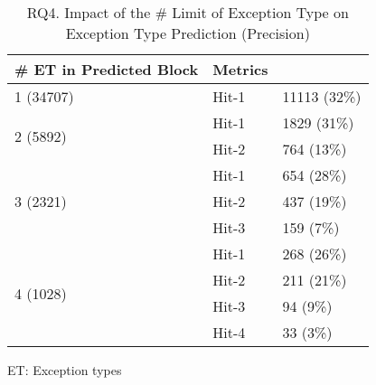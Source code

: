 \begin{table}[t]
	\caption{RQ4. Impact of the \# Limit of Exception Type on Exception Type Prediction (Precision)}
	\vspace{-10pt}
	\tabcolsep 2pt
	{\small
		\begin{center}
			\renewcommand{\arraystretch}{1}
			\begin{tabular}{p{3cm}<{\centering}|p{2cm}<{\centering}|p{2cm}<{\centering}}
				\hline
				\# ET in Predicted Block & Metrics & {\textsc{\tool}\xspace} \\
				\hline
				\multirow{1}{*}{1 (34707)}   & Hit-1  & 11113 (32\%) \\
				\hline
				\multirow{2}{*}{2 (5892)}  & Hit-1   & 1829 (31\%) \\
				& Hit-2       						& 764 (13\%) \\
				\hline
				\multirow{3}{*}{3 (2321)}  & Hit-1    & 654 (28\%) \\
				& Hit-2         					& 437 (19\%)\\
				& Hit-3         				  	& 159 (7\%) \\
				\hline
				\multirow{4}{*}{4 (1028)}  & Hit-1    & 268 (26\%) \\
				& Hit-2         					& 211 (21\%)\\
				& Hit-3         				  	& 94 (9\%) \\
				& Hit-4         				  	& 33 (3\%) \\
				\hline
			\end{tabular}
			ET: Exception types
			\label{RQ4_results_5}
		\end{center}
	}
\end{table}